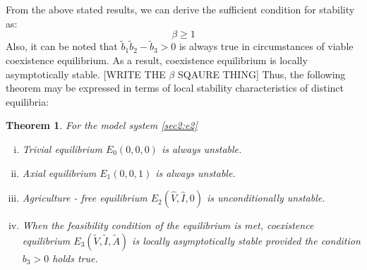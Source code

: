 \documentclass[12pt]{article}
\newtheorem{theorem}{Theorem}[section]
\numberwithin{equation}{section}
\begin{document}
From the above stated results, we can derive the sufficient condition for stability as:
\begin{equation}
\beta \geq 1
\end{equation} 
Also, it can be noted that $\tilde b_1\tilde b_2-\tilde b_3>0$ is always true in circumstances of viable coexistence equilibrium. As a result, coexistence equilibrium is locally asymptotically stable. [WRITE THE $\beta$ SQAURE THING]
Thus, the following theorem may be expressed in terms of local stability characteristics of distinct equilibria:
\begin{theorem}\label{Theorem 3.4}
For the model system \eqref{sec2:e2}
\begin{enumerate}[i)]
\item Trivial equilibrium $E_0(0,0,0)$ is always unstable.
\item Axial equilibrium $E_1(0,0,1)$ is always unstable.
\item Agriculture - free equilibrium $E_2(\hat V,\hat I,0)$ is unconditionally unstable.
\item When the feasibility condition of the equilibrium is met, coexistence equilibrium $E_3(\tilde V,\tilde I,\tilde A)$ is locally asymptotically stable provided the condition $b_3>0$ holds true.
\end{enumerate}
 \end{theorem}
\end{document}
